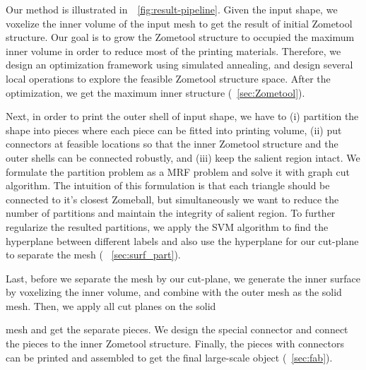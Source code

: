 Our method is illustrated in~\figname~\ref{fig:result-pipeline}.
Given the input shape, we voxelize the inner volume of the input mesh to get the result of initial Zometool structure.
Our goal is to grow the Zometool structure to occupied the maximum inner volume in order to reduce most of the printing materials.
Therefore, we design an optimization framework using simulated annealing, and design several local operations to explore the feasible Zometool structure space.
After the optimization, we get the maximum inner structure (\secname~\ref{sec:Zometool}).

Next, in order to print the outer shell of input shape, we have to (i) partition the shape into pieces where each piece can be fitted into printing volume, (ii) put connectors at feasible locations so that the inner Zometool structure and the outer shells can be connected robustly, and (iii) keep the salient region intact.
We formulate the partition problem as a MRF problem and solve it with graph cut algorithm.
The intuition of this formulation is that each triangle should be connected to it's closest Zomeball, but simultaneously we want to reduce the number of partitions and maintain the integrity of salient region.
To further regularize the resulted partitions, we apply the SVM algorithm to find the hyperplane  between different labels and also use the hyperplane for our cut-plane to separate the mesh ( \secname~\ref{sec:surf_part}).

Last, before we separate the mesh by our cut-plane, we generate the inner surface by voxelizing the inner volume, and combine with the outer mesh as the solid mesh. 
Then, we apply all cut planes on the solidmesh and get the separate pieces. 
We design the special connector and connect the pieces to the inner Zometool structure. 
Finally, the pieces with connectors can be printed and assembled to get the final large-scale object (\secname~\ref{sec:fab}).
